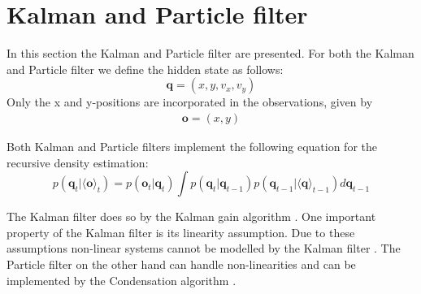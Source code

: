 \documentclass[conference]{IEEEtran}
\begin{document}
\section{Kalman and Particle filter}
In this section the Kalman and Particle filter are presented. 
For both the Kalman and Particle filter we define the hidden state as follows:
\begin{equation*}
\textbf{q} = (x, y, v_x, v_y)   \tag{3}
\end{equation*}
Only the x and y-positions are incorporated in the observations, given by
\begin{equation*}
    \begin{aligned}
    \textbf{o} = (x, y)
    \end{aligned}
\tag{4}
\end{equation*}

Both Kalman and Particle filters implement the following equation for the recursive density estimation:
\begin{equation*}
    p(\textbf{q}_t | \langle \textbf{o} \rangle _t) =
    p(\textbf{o}_t | \textbf{q}_t) \int p(\textbf{q}_t | \textbf{q}_{t-1}) p(\textbf{q}_{t-1} | \langle \textbf{q} \rangle _{t-1}) d \textbf{q}_{t-1}
\tag{5}
\end{equation*}

The Kalman filter does so by the Kalman gain algorithm \cite{b2}.
One important property of the Kalman filter is its linearity assumption.
Due to these assumptions non-linear systems cannot be modelled by the Kalman filter \cite{b2}. %
The Particle filter on the other hand can handle non-linearities and can be implemented by the Condensation algorithm \cite{b3}. 



\end{document}
